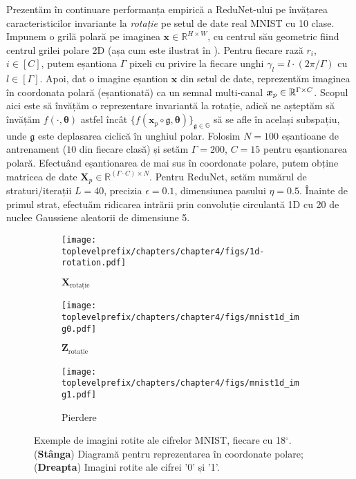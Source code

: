 \documentclass[../../book-main_ro.tex]{subfiles}
\begin{document}
\begin{example}
Prezentăm în continuare performanța empirică a ReduNet-ului pe învățarea caracteristicilor invariante la \textit{rotație} pe setul de date real MNIST cu 10 clase. 
Impunem o grilă polară pe imaginea $\bm{x}\in\mathbb{R}^{H\times W}$, cu centrul său geometric fiind centrul grilei polare 2D (așa cum este ilustrat în ). 
Pentru fiecare rază $r_i$, $i \in [C]$, putem eșantiona $\Gamma$ pixeli cu privire la fiecare unghi $\gamma_l =l\cdot({2\pi}/\Gamma)$ cu $l \in [\Gamma]$. 
Apoi, dat o imagine eșantion $\bm{x}$ din setul de date, reprezentăm imaginea în coordonata polară (eșantionată) ca un semnal multi-canal $\bm{x}_p \in\mathbb{R}^{\Gamma\times C}$.  
Scopul aici este să învățăm o reprezentare invariantă la rotație, adică ne așteptăm să învățăm $f(\cdot, \bm{\theta})$ astfel încât $\{f(\bm{x}_p \circ \mathfrak{g}, \bm{\theta})\}_{\mathfrak{g} \in\mathbb{G}}$ să se afle în același subspațiu, unde $\mathfrak{g}$ este deplasarea ciclică în unghiul polar.  
Folosim $N=100$ eșantioane de antrenament ($10$ din fiecare clasă) și setăm $\Gamma=200$, $C=15$ pentru eșantionarea polară. 
Efectuând eșantionarea de mai sus în coordonate polare, putem obține matricea de date $\bm{X}_p \in \mathbb{R}^{(\Gamma\cdot C) \times N}$. 
Pentru ReduNet, setăm numărul de straturi/iterații $L=40$, precizia $\epsilon=0.1$, dimensiunea pasului $\eta=0.5$. Înainte de primul strat, efectuăm ridicarea intrării prin convoluție circulantă 1D cu 20 de nuclee Gaussiene aleatorii de dimensiune 5.   

\begin{figure}[t]
    \begin{subfigure}[t]{0.3\textwidth}
        \centering
        \texttt{[image: \\toplevelprefix/chapters/chapter4/figs/1d-rotation.pdf]}
        \caption{$\bm{X}_{\text{rotație}}$}
    \end{subfigure}
    \hfill
    \begin{subfigure}[t]{0.3\textwidth}
        \centering
        \texttt{[image: \\toplevelprefix/chapters/chapter4/figs/mnist1d\_img0.pdf]}
        \caption{$\bm{Z}_{\text{rotație}}$}
    \end{subfigure}
    \hfill
    \begin{subfigure}[t]{0.3\textwidth}
        \centering
        \texttt{[image: \\toplevelprefix/chapters/chapter4/figs/mnist1d\_img1.pdf]}
        \caption{Pierdere}
    \end{subfigure}
    \caption{\small Exemple de imagini rotite ale cifrelor MNIST, fiecare cu 18$^{\circ}$. (\textbf{Stânga}) Diagramă pentru reprezentarea în coordonate polare; (\textbf{Dreapta}) Imagini rotite ale cifrei '0' și '1'.}
    \label{fig:samples-invariant-1d-mnist-diagram}
\end{figure}



\end{example}
\end{document}
